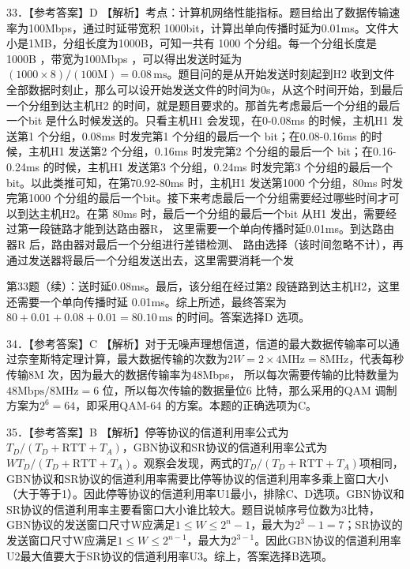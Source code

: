 \documentclass[UTF8,11pt]{ctexart}
\begin{document}
33．【参考答案】D 【解析】考点：计算机网络性能指标。题目给出了数据传输速率为100Mbps，通过时延带宽积 1000bit，计算出单向传播时延为0.01ms。文件大小是1MB，分组长度为1000B，可知一共有 1000 个分组。每一个分组长度是1000B ，带宽为100Mbps ，可以得出发送时延为 \(\displaystyle (1000\times8)/(100\mathrm{M})=0.08\,\mathrm{ms}\)。题目问的是从开始发送时刻起到H2 收到文件全部数据时刻止，那么可以设开始发送文件的时间为0s，从这个时间开始，到最后一个分组到达主机H2 的时间，就是题目要求的。那首先考虑最后一个分组的最后一个bit 是什么时候发送的。只看主机H1 会发现，在0-0.08ms 的时候，主机H1 发送第1 个分组，0.08ms 时发完第1 个分组的最后一个 bit；在0.08-0.16ms 的时候，主机H1 发送第2 个分组，0.16ms 时发完第2 个分组的最后一个 bit；在0.16-0.24ms 的时候，主机H1 发送第3 个分组，0.24ms 时发完第3 个分组的最后一个 bit。以此类推可知，在第70.92-80ms 时，主机H1 发送第1000 个分组，80ms 时发完第1000 个分组的最后一个bit。接下来考虑最后一个分组需要经过哪些时间才可以到达主机H2。在第 80ms 时，最后一个分组的最后一个bit 从H1 发出，需要经过第一段链路才能到达路由器R， 这里需要一个单向传播时延0.01ms。到达路由器R 后，路由器对最后一个分组进行差错检测、 路由选择（该时间忽略不计），再通过发送器将最后一个分组发送出去，这里需要消耗一个发


第33题（续）：送时延0.08ms。最后，该分组在经过第2 段链路到达主机H2，这里还需要一个单向传播时延 0.01ms。综上所述，最终答案为\(\displaystyle 80+0.01+0.08+0.01=80.10\,\mathrm{ms}\) 的时间。答案选择D 选项。


34．【参考答案】C 【解析】对于无噪声理想信道，信道的最大数据传输率可以通过奈奎斯特定理计算，最大数据传输的次数为\(\displaystyle 2W=2\times4\mathrm{MHz}=8\mathrm{MHz}\)，代表每秒传输8M 次，因为最大的数据传输率为48Mbps， 所以每次需要传输的比特数量为\(\displaystyle 48\mathrm{Mbps}/8\mathrm{MHz}=6\) 位，所以每次传输的数据量位6 比特，那么采用的QAM 调制方案为\(\displaystyle 2^6=64\)，即采用QAM-64 的方案。本题的正确选项为C。


35．【参考答案】B 【解析】停等协议的信道利用率公式为\(\displaystyle T_D/(T_D+\mathrm{RTT}+T_A)\)，GBN协议和SR协议的信道利用率公式为\(\displaystyle WT_D/(T_D+\mathrm{RTT}+T_A)\)。观察会发现，两式的\(\displaystyle T_D/(T_D+\mathrm{RTT}+T_A)\)项相同，GBN协议和SR协议的信道利用率需要比停等协议的信道利用率多乘上窗口大小（大于等于1）。因此停等协议的信道利用率U1最小，排除C、D选项。GBN协议和SR协议的信道利用率主要看窗口大小谁比较大。题目说帧序号位数为3比特，GBN协议的发送窗口尺寸W应满足\(\displaystyle 1\le W\le2^n-1\)，最大为\(\displaystyle 2^3-1=7\)；SR协议的发送窗口尺寸W应满足\(\displaystyle 1\le W\le2^{n-1}\)，最大为\(\displaystyle 2^{3-1}\)。因此GBN协议的信道利用率U2最大值要大于SR协议的信道利用率U3。综上，答案选择B选项。
\end{document}
